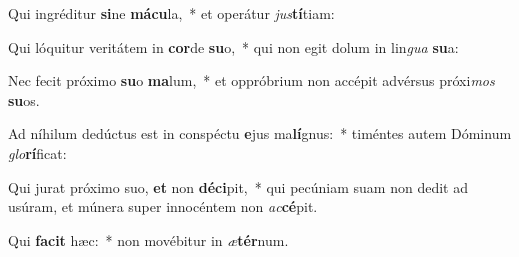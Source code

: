 \item Qui ingréditur \textbf{si}ne \textbf{má}\textbf{cu}la,~* et operátur \textit{jus}\textbf{tí}tiam:
\item Qui lóquitur veritátem in \textbf{cor}de \textbf{su}o,~* qui non egit dolum in lin\textit{gua} \textbf{su}a:
\item Nec fecit próximo \textbf{su}o \textbf{ma}lum,~* et oppróbrium non accépit advérsus próxi\textit{mos} \textbf{su}os.
\item Ad níhilum dedúctus est in conspéctu \textbf{e}jus ma\textbf{lí}gnus:~* timéntes autem Dóminum \textit{glo}\textbf{rí}ficat:
\item Qui jurat próximo suo, \textbf{et} non \textbf{dé}\textbf{ci}pit,~* qui pecúniam suam non dedit ad usúram, et múnera super innocéntem non \textit{ac}\textbf{cé}pit.
\item Qui \textbf{fa}\textbf{cit} hæc:~* non movébitur in \textit{æ}\textbf{tér}num.
